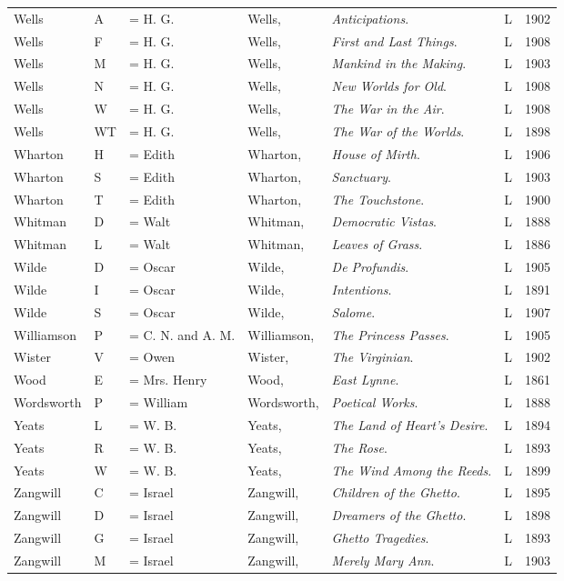 \begin{sidewaystable}
\centering
\begin{tabular}{p{} p{} p{} p{} p{} p{} p{}}
Wells & A & = H. G. & Wells, & \textit{Anticipations}. & L & 1902 \\
Wells & F & = H. G. & Wells, & \textit{First and Last Things}. & L & 1908 \\
Wells & M & = H. G. & Wells, & \textit{Mankind in the Making}. & L & 1903 \\
Wells & N & = H. G. & Wells, & \textit{New Worlds for Old}. & L & 1908 \\
Wells & W & = H. G. & Wells, & \textit{The War in the Air}. & L & 1908 \\
Wells & WT & = H. G. & Wells, & \textit{The War of the Worlds}. & L & 1898 \\
Wharton & H & = Edith & Wharton, & \textit{House of Mirth}. & L & 1906 \\
Wharton & S & = Edith & Wharton, & \textit{Sanctuary}. & L & 1903 \\
Wharton & T & = Edith & Wharton, & \textit{The Touchstone}. & L & 1900 \\
Whitman & D & = Walt & Whitman, & \textit{Democratic Vistas}. & L & 1888 \\
Whitman & L & = Walt & Whitman, & \textit{Leaves of Grass}. & L & 1886 \\
Wilde & D & = Oscar & Wilde, & \textit{De Profundis}. & L & 1905 \\
Wilde & I & = Oscar & Wilde, & \textit{Intentions}. & L & 1891 \\
Wilde & S & = Oscar & Wilde, & \textit{Salome}. & L & 1907 \\
Williamson & P & = C. N. and A. M. & Williamson, & \textit{The Princess Passes}. & L & 1905 \\
Wister & V & = Owen & Wister, & \textit{The Virginian}. & L & 1902 \\
Wood & E & = Mrs. Henry & Wood, & \textit{East Lynne}. & L & 1861 \\
Wordsworth & P & = William & Wordsworth, & \textit{Poetical Works}. & L & 1888 \\
Yeats & L & = W. B. & Yeats, & \textit{The Land of Heart's Desire}. & L & 1894 \\
Yeats & R & = W. B. & Yeats, & \textit{The Rose}. & L & 1893 \\
Yeats & W & = W. B. & Yeats, & \textit{The Wind Among the Reeds}. & L & 1899 \\
Zangwill & C & = Israel & Zangwill, & \textit{Children of the Ghetto}. & L & 1895 \\
Zangwill & D & = Israel & Zangwill, & \textit{Dreamers of the Ghetto}. & L & 1898 \\
Zangwill & G & = Israel & Zangwill, & \textit{Ghetto Tragedies}. & L & 1893 \\
Zangwill & M & = Israel & Zangwill, & \textit{Merely Mary Ann}. & L & 1903 \\
\end{tabular}
\end{sidewaystable}
